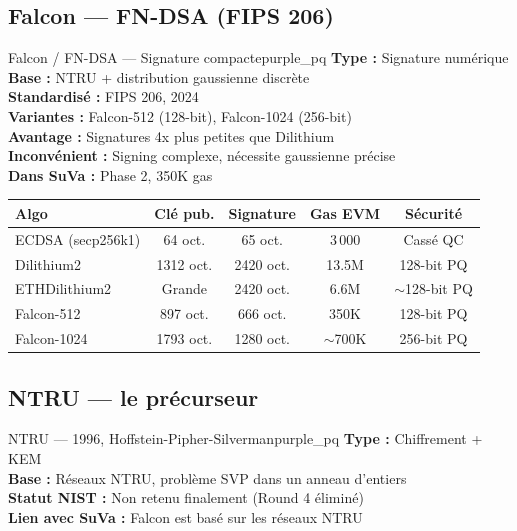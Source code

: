 \documentclass[12pt, a4paper]{article}
\begin{document}
\subsection{Falcon --- FN-DSA (FIPS 206)}

\begin{algobox}{Falcon / FN-DSA --- Signature compacte}{purple_pq}
\textbf{Type :} Signature numérique\\
\textbf{Base :} NTRU + distribution gaussienne discrète\\
\textbf{Standardisé :} FIPS 206, 2024\\
\textbf{Variantes :} Falcon-512 (128-bit), Falcon-1024 (256-bit)\\
\textbf{Avantage :} Signatures 4x plus petites que Dilithium\\
\textbf{Inconvénient :} Signing complexe, nécessite gaussienne précise\\
\textbf{Dans SuVa :} Phase 2, 350K gas
\end{algobox}

\begin{center}
\renewcommand{\arraystretch}{1.4}
\begin{tabular}{lcccc}
  \toprule
  \textbf{Algo} & \textbf{Clé pub.} & \textbf{Signature} & \textbf{Gas EVM} & \textbf{Sécurité} \\
  \midrule
  ECDSA (secp256k1) & 64 oct. & 65 oct. & 3\,000 & \textcolor{danger_red}{Cassé QC} \\
  Dilithium2 & 1312 oct. & 2420 oct. & 13.5M & 128-bit PQ \\
  ETHDilithium2 & Grande & 2420 oct. & 6.6M & $\sim$128-bit PQ \\
  Falcon-512 & 897 oct. & 666 oct. & 350K & 128-bit PQ \\
  Falcon-1024 & 1793 oct. & 1280 oct. & $\sim$700K & 256-bit PQ \\
  \bottomrule
\end{tabular}
\end{center}

\subsection{NTRU --- le précurseur}

\begin{algobox}{NTRU --- 1996, Hoffstein-Pipher-Silverman}{purple_pq}
\textbf{Type :} Chiffrement + KEM\\
\textbf{Base :} Réseaux NTRU, problème SVP dans un anneau d'entiers\\
\textbf{Statut NIST :} Non retenu finalement (Round 4 éliminé)\\
\textbf{Lien avec SuVa :} Falcon est basé sur les réseaux NTRU
\end{algobox}
\end{document}
